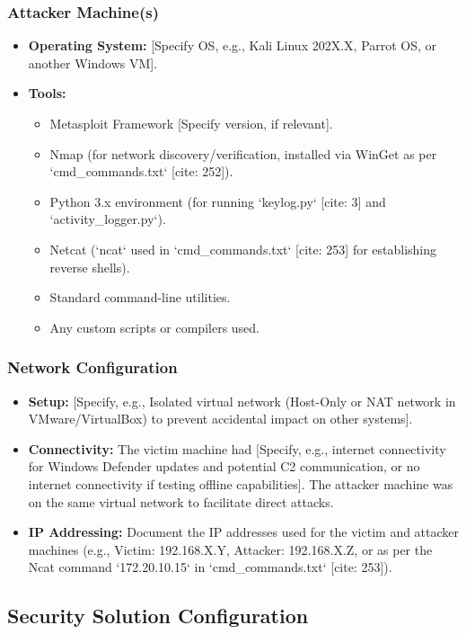 \documentclass[11pt]{article}
\begin{document}
	\subsubsection{Attacker Machine(s)}
	\begin{itemize}
		\item \textbf{Operating System:} [Specify OS, e.g., Kali Linux 202X.X, Parrot OS, or another Windows VM].
		\item \textbf{Tools:}
		\begin{itemize}
			\item Metasploit Framework [Specify version, if relevant].
			\item Nmap (for network discovery/verification, installed via WinGet as per `cmd\_commands.txt` [cite: 252]).
			\item Python 3.x environment (for running `keylog.py` [cite: 3] and `activity_logger.py`).
			\item Netcat (`ncat` used in `cmd\_commands.txt` [cite: 253] for establishing reverse shells).
			\item Standard command-line utilities.
			\item Any custom scripts or compilers used.
		\end{itemize}
	\end{itemize}
	
	\subsubsection{Network Configuration}
	\begin{itemize}
		\item \textbf{Setup:} [Specify, e.g., Isolated virtual network (Host-Only or NAT network in VMware/VirtualBox) to prevent accidental impact on other systems].
		\item \textbf{Connectivity:} The victim machine had [Specify, e.g., internet connectivity for Windows Defender updates and potential C2 communication, or no internet connectivity if testing offline capabilities]. The attacker machine was on the same virtual network to facilitate direct attacks.
		\item \textbf{IP Addressing:} Document the IP addresses used for the victim and attacker machines (e.g., Victim: 192.168.X.Y, Attacker: 192.168.X.Z, or as per the Ncat command `172.20.10.15` in `cmd\_commands.txt` [cite: 253]).
	\end{itemize}
	
	\subsection{Security Solution Configuration}
\end{document}
